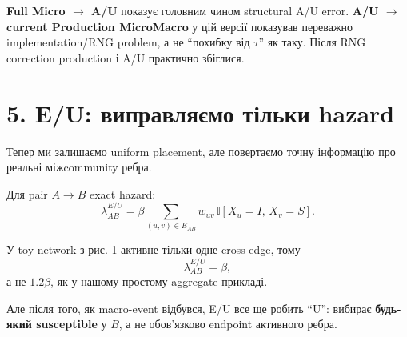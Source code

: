 \documentclass[11pt,a4paper]{article}
\newcommand{\I}{\mathbb{I}}
\begin{document}
\begin{tcolorbox}[colback=soft,colframe=macro,title=Як це читати]
\textbf{Full Micro $\to$ A/U} показує головним чином structural A/U error.\newline
\textbf{A/U $\to$ current Production MicroMacro} у цій версії показував переважно implementation/RNG problem, а не ``похибку від $\tau$'' як таку. Після RNG correction production і A/U практично збіглися.
\end{tcolorbox}

\section*{5. E/U: виправляємо тільки hazard}

Тепер ми залишаємо uniform placement, але повертаємо точну інформацію про реальні міжcommunity ребра.

Для pair $A\to B$ exact hazard:
\[
 \lambda^{E/U}_{AB}
 =\beta\sum_{(u,v)\in E_{AB}} w_{uv}\,\I[X_u=I,\,X_v=S].
\]

У toy network з рис. 1 активне тільки одне cross-edge, тому
\[
 \lambda^{E/U}_{AB}=\beta,
\]
а не $1.2\beta$, як у нашому простому aggregate прикладі.

Але після того, як macro-event відбувся, E/U все ще робить ``U'': вибирає \textbf{будь-який susceptible} у $B$, а не обов'язково endpoint активного ребра.
\end{document}
